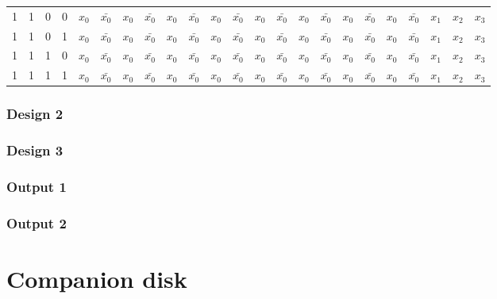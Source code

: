 \documentclass[12pt,openany,a4paper]{book}
\begin{document}
\begin{landscape}
\begin{table}[H]
\begin{tabular}{|cccc|ccccccccccccccccccc|}
    1     & 1     & 0     & 0     & $x_0$ & $\bar{x_0}$ & $x_0$ & $\bar{x_0}$ & $x_0$ & $\bar{x_0}$ & $x_0$ & $\bar{x_0}$ & $x_0$ & $\bar{x_0}$ & $x_0$ & $\bar{x_0}$ & $x_0$ & $\bar{x_0}$ & $x_0$ & $\bar{x_0}$ & $x_1$ & $x_2$ & $x_3$ \\
    1     & 1     & 0     & 1     & $x_0$ & $\bar{x_0}$ & $x_0$ & $\bar{x_0}$ & $x_0$ & $\bar{x_0}$ & $x_0$ & $\bar{x_0}$ & $x_0$ & $\bar{x_0}$ & $x_0$ & $\bar{x_0}$ & $x_0$ & $\bar{x_0}$ & $x_0$ & $\bar{x_0}$ & $x_1$ & $x_2$ & $x_3$ \\
    1     & 1     & 1     & 0     & $x_0$ & $\bar{x_0}$ & $x_0$ & $\bar{x_0}$ & $x_0$ & $\bar{x_0}$ & $x_0$ & $\bar{x_0}$ & $x_0$ & $\bar{x_0}$ & $x_0$ & $\bar{x_0}$ & $x_0$ & $\bar{x_0}$ & $x_0$ & $\bar{x_0}$ & $x_1$ & $x_2$ & $x_3$ \\
    1     & 1     & 1     & 1     & $x_0$ & $\bar{x_0}$ & $x_0$ & $\bar{x_0}$ & $x_0$ & $\bar{x_0}$ & $x_0$ & $\bar{x_0}$ & $x_0$ & $\bar{x_0}$ & $x_0$ & $\bar{x_0}$ & $x_0$ & $\bar{x_0}$ & $x_0$ & $\bar{x_0}$ & $x_1$ & $x_2$ & $x_3$ \\
    \hline
    \end{tabular}%
  \label{tab:addlabel}%
\end{table}%

\end{landscape}


\subsection{Design 2}




\subsection{Design 3}




\subsection{Output 1}


\subsection{Output 2}






\chapter{Companion disk}
\end{document}
